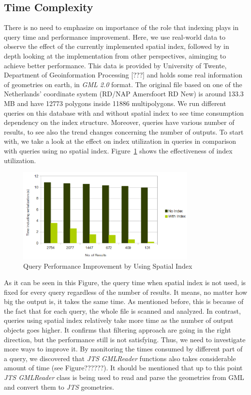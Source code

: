 \documentclass[a4paper,12pt]{article}
\begin{document}
\subsection{Time Complexity}

There is no need to emphasize on importance of the role that indexing plays in query time and performance improvement. Here, we use real-world data to observe the effect of the currently implemented spatial index, followed by in depth looking at the implementation from other perspectives, aiminging to achieve better performance. This data is provided by University of Twente, Department of Geoinformation Processing [???] and holds some real information of geometries on earth, in \textit{GML 2.0} format. The original file based on one of the Netherlands' coordinate system (RD/NAP Amersfoort RD New) is around 133.3 MB and have 12773 polygons inside 11886 multipolygons.
We run different queries on this database with and without spatial index to see time consumption dependency on the index structure. Moreover, queries have various number of results, to see also the trend changes concerning the number of outputs.
To start with, we take a look at the effect on index utilization in queries in comparison with queries using no spatial index. Figure~\ref{figIndexEfficiency} shows the effectiveness of index utilization.

 \begin{figure}
\centering
\includegraphics[width=0.8\textwidth]{IndexEfficiency}
\caption{Query Performance Improvement by Using Spatial Index}
\label{figIndexEfficiency}
\end{figure}

As it can be seen in this Figure, the query time when spatial index is not used, is fixed for every query regardless of the number of results. It means, no matter how big the output is, it takes the same time. As mentioned before, this is because of the fact that for each query, the whole file is scanned and analyzed. In contrast, queries using spatial index relatively take more time as the number of output objects goes higher. It confirms that filtering approach are going in the right direction, but the performance still is not satisfying. Thus, we need to investigate more ways to improve it.
By monitoring the times consumed by different part of a query, we discovered that \textit{JTS GMLReader} functions also takes considerable amount of time (see Figure??????). It should be mentioned that up to this point \textit{JTS GMLReader} class is being used to read and parse the geometries from GML and convert them to \textit{JTS} geometries.  
\end{document}
